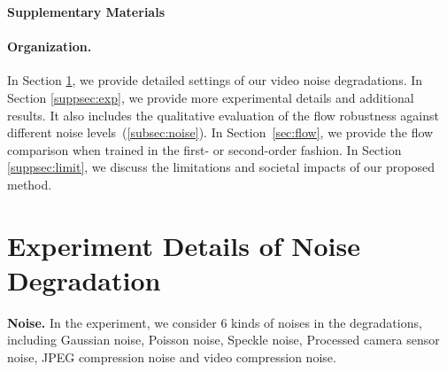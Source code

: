 \documentclass[10pt,twocolumn,letterpaper]{article}
\def\red{\textcolor{black}}
\newlength \g
\begin{document}
{\small


}

\newpage
\appendix


\begin{center}
    \Large{\textbf{Supplementary Materials}}
\end{center}


\maketitle
\ificcvfinal\thispagestyle{empty}\fi

\setcounter{section}{0}
\renewcommand\thesection{\Alph{section}}
\renewcommand\thefigure{S\arabic{figure}}    
\setcounter{figure}{0}    
\renewcommand\thetable{S\arabic{table}}    
\setcounter{table}{0}
\renewcommand{\theequation}{S\arabic{equation}}
\setcounter{equation}{0}

\def\red{\textcolor{red}}

\vspace{-5mm}
\paragraph{Organization.}
In Section \ref{suppsec:degradation_detail}, we provide detailed settings of our video noise degradations. 
In Section \ref{suppsec:exp}, we provide more experimental  details and additional results. It also includes the qualitative evaluation of the flow robustness against different noise levels~(\ref{subsec:noise}).  In Section~\ref{sec:flow}, we provide the flow comparison when trained in the first- or second-order fashion. 
In Section \ref{suppsec:limit}, we discuss the limitations and societal impacts of our proposed method.


\vspace{-1mm}
\section{Experiment Details of Noise Degradation} \label{suppsec:degradation_detail}

\vspace{-1mm}
\noindent\textbf{Noise.}
In the experiment, we consider 6 kinds of noises in the degradations, including Gaussian noise, Poisson noise, Speckle noise, Processed camera sensor noise, JPEG compression noise and video compression noise.
\end{document}
